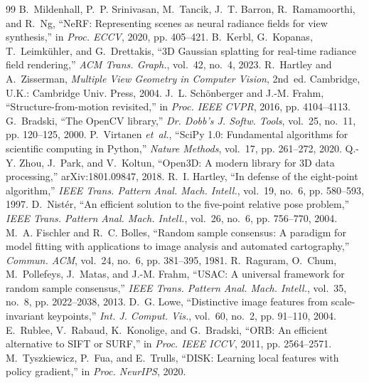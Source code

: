 \documentclass[conference,11pt]{IEEEtran}
\begin{document}

\begin{thebibliography}{99}
 B.~Mildenhall, P.~P. Srinivasan, M.~Tancik, J.~T. Barron, R.~Ramamoorthi, and R.~Ng, ``NeRF: Representing scenes as neural radiance fields for view synthesis,'' in \emph{Proc. ECCV}, 2020, pp. 405--421.
 B.~Kerbl, G.~Kopanas, T.~Leimk{\"u}hler, and G.~Drettakis, ``3D Gaussian splatting for real-time radiance field rendering,'' \emph{ACM Trans. Graph.}, vol.~42, no.~4, 2023.
 R.~Hartley and A.~Zisserman, \emph{Multiple View Geometry in Computer Vision}, 2nd~ed. Cambridge, U.K.: Cambridge Univ. Press, 2004.
 J.~L. Sch{\"o}nberger and J.-M. Frahm, ``Structure-from-motion revisited,'' in \emph{Proc. IEEE CVPR}, 2016, pp. 4104--4113.
 G.~Bradski, ``The OpenCV library,'' \emph{Dr. Dobb's J. Softw. Tools}, vol.~25, no.~11, pp. 120--125, 2000.
 P.~Virtanen \emph{et~al.}, ``SciPy 1.0: Fundamental algorithms for scientific computing in Python,'' \emph{Nature Methods}, vol.~17, pp. 261--272, 2020.
 Q.-Y. Zhou, J.~Park, and V.~Koltun, ``Open3D: A modern library for 3D data processing,'' arXiv:1801.09847, 2018.
 R.~I. Hartley, ``In defense of the eight-point algorithm,'' \emph{IEEE Trans. Pattern Anal. Mach. Intell.}, vol.~19, no.~6, pp. 580--593, 1997.
 D.~Nist{\'e}r, ``An efficient solution to the five-point relative pose problem,'' \emph{IEEE Trans. Pattern Anal. Mach. Intell.}, vol.~26, no.~6, pp. 756--770, 2004.
 M.~A. Fischler and R.~C. Bolles, ``Random sample consensus: A paradigm for model fitting with applications to image analysis and automated cartography,'' \emph{Commun. ACM}, vol.~24, no.~6, pp. 381--395, 1981.
 R.~Raguram, O.~Chum, M.~Pollefeys, J.~Matas, and J.-M. Frahm, ``USAC: A universal framework for random sample consensus,'' \emph{IEEE Trans. Pattern Anal. Mach. Intell.}, vol.~35, no.~8, pp. 2022--2038, 2013.
 D.~G. Lowe, ``Distinctive image features from scale-invariant keypoints,'' \emph{Int. J. Comput. Vis.}, vol.~60, no.~2, pp. 91--110, 2004.
 E.~Rublee, V.~Rabaud, K.~Konolige, and G.~Bradski, ``ORB: An efficient alternative to SIFT or SURF,'' in \emph{Proc. IEEE ICCV}, 2011, pp. 2564--2571.
 M.~Tyszkiewicz, P.~Fua, and E.~Trulls, ``DISK: Learning local features with policy gradient,'' in \emph{Proc. NeurIPS}, 2020.

\end{thebibliography}
\end{document}
